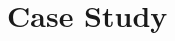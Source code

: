 \documentclass[lettersize,journal]{IEEEtran}
\begin{document}







\section{Case Study}
\end{document}
